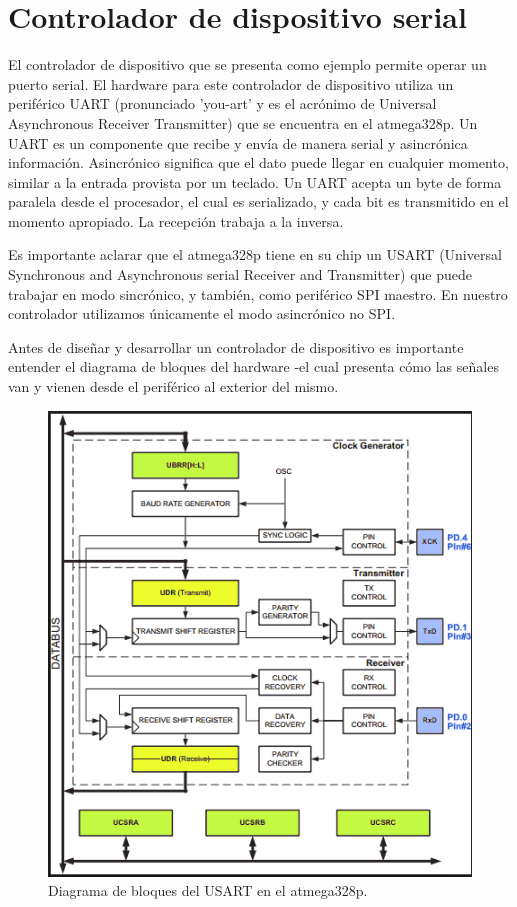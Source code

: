 \documentclass[output=paper, 
colorlinks,
citecolor=brown,
newtxmath
]{langscibook}
\begin{document}
\section {Controlador de dispositivo serial}

El controlador de dispositivo que se presenta como ejemplo permite
operar un puerto serial. El hardware para este controlador
de dispositivo utiliza un periférico UART 
(pronunciado 'you-art' y es el acrónimo de
Universal Asynchronous Receiver Transmitter) que se encuentra en el atmega328p.
Un UART es un componente que recibe y envía de manera serial y asincrónica
información. Asincrónico significa que el dato puede llegar en cualquier
momento, similar a la entrada provista por un teclado. Un UART acepta
un byte de forma paralela desde el procesador, el cual es serializado,
y cada bit es transmitido en el momento apropiado. La recepción trabaja
a la inversa.

Es importante aclarar que el atmega328p tiene en su chip un USART (Universal Synchronous and Asynchronous serial Receiver and Transmitter) que puede trabajar
en modo sincrónico, y también, como periférico SPI maestro. En nuestro
controlador utilizamos únicamente el modo asincrónico no SPI.

Antes de diseñar y desarrollar un controlador de dispositivo 
es importante entender el diagrama de bloques del hardware -el cual
presenta cómo las señales van y vienen desde el periférico al exterior del mismo.
\begin{figure}
\includegraphics[width=\linewidth]{images/usart-block.png}
\caption{Diagrama de bloques del USART en el atmega328p.}
\label{fig:usart-block}
\end{figure}
\end{document}
